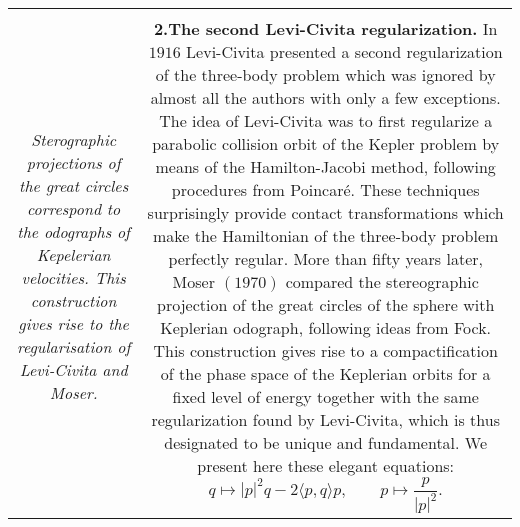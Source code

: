 \documentclass[10pt,a4paper]{article}
\def\noi{\noindent}
\theoremstyle{definition}
\begin{document}
\noi \begin{tabular}{cc}
\begin{minipage}[b]{7.0cm} \vspace*{0.5cm} \footnotesize
\texttt{[image: cfms-2004/proiezione stereografica.png]}\\
\noi \emph{Sterographic projections of the great circles correspond to the odographs of Kepelerian velocities. This construction gives rise to the regularisation of Levi-Civita and Moser.}
\end{minipage} &
\begin{minipage}[b]{11.42cm} \vspace*{0.1cm} \footnotesize
\noi \textbf{2.The second Levi-Civita regularization.}
In $1916$ Levi-Civita presented a second regularization of the three-body problem which was ignored by almost all the authors with only a few exceptions. The idea of Levi-Civita was to first regularize a parabolic collision orbit of the Kepler problem by means of the Hamilton-Jacobi method, following procedures from Poincaré. These techniques surprisingly provide contact transformations which make the Hamiltonian of the three-body problem perfectly regular. 
More than fifty years later, Moser $(1970)$ compared the stereographic projection of the great circles of the sphere with Keplerian odograph, following ideas from Fock. This construction gives rise to a compactification of the phase space of the Keplerian orbits for a fixed level of energy together with the same regularization found by Levi-Civita, which is thus designated to be unique and fundamental. We present here these elegant equations:
\[
q \mapsto |p|^2q - 2 \langle  p , q \rangle p, \qquad p \mapsto \frac{p}{|p|^2}.
\]
\end{minipage}\\
\end{tabular}
\end{document}
